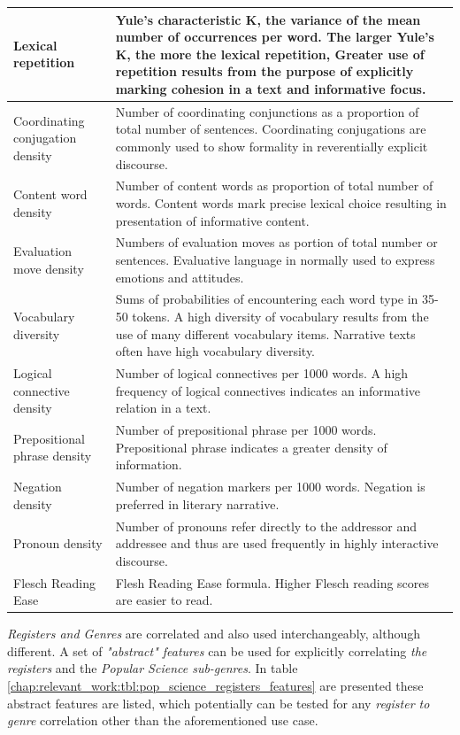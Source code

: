 \begin{table}[t]
\begin{tabular}{p{2cm}p{12cm}}
        \hline
        Lexical repetition & Yule's characteristic K, the variance of the mean number of occurrences per word. The larger Yule's K, the more the lexical repetition, Greater use of repetition results from the purpose of explicitly marking cohesion in a text and informative focus.  \\
        \hline
        Coordinating conjugation density & Number of coordinating conjunctions as a proportion of total number of sentences. Coordinating conjugations are commonly used to show formality in reverentially explicit discourse.  \\
        \hline
        Content word density & Number of content words as proportion of total number of words. Content words mark precise lexical choice resulting in presentation of informative content.\\
        \hline
        Evaluation move density & Numbers of evaluation moves as portion of total number or sentences. Evaluative language in normally used to express emotions and attitudes.  \\
        \hline
        Vocabulary diversity & Sums of probabilities of encountering each word type in 35-50 tokens. A high diversity of vocabulary results from the use of many different vocabulary items. Narrative texts often have high vocabulary diversity.  \\
        \hline
        Logical connective density & Number of logical connectives per 1000 words. A high frequency of logical connectives indicates an informative relation in a text.  \\
        \hline
        Prepositional phrase density & Number of prepositional phrase per 1000 words. Prepositional phrase indicates a greater density of information.  \\
        \hline
        Negation density & Number of negation markers per 1000 words. Negation is preferred in literary narrative.  \\
        \hline
        Pronoun density & Number of pronouns refer directly to the addressor and addressee and thus are used frequently in highly interactive discourse. \\
        \hline
        Flesch Reading Ease & Flesh Reading Ease formula. Higher Flesch reading scores are easier to read.  \\
  		\hline
	\end{tabular}
\end{table}

\textit{Registers and Genres} are correlated and also used interchangeably, although different. A set of \textit{ "abstract" features} can be used for explicitly correlating \textit{the registers} and the \textit{Popular Science sub-genres}.  In table \ref{chap:relevant_work:tbl:pop_science_registers_features} are presented these abstract features are listed, which potentially can be tested for any \textit{register to genre} correlation other than the aforementioned use case.

